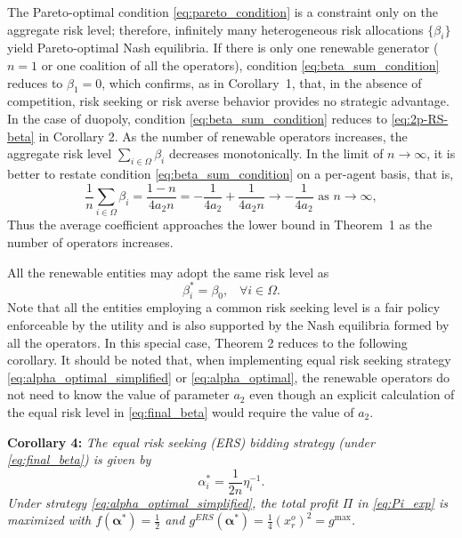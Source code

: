 \documentclass[journal]{IEEEtran}
\begin{document}
The Pareto-optimal condition \eqref{eq:pareto_condition} is a constraint only on the aggregate risk level; therefore, infinitely many heterogeneous risk allocations $\{\beta_i\}$ yield Pareto-optimal Nash equilibria.
If there is only one renewable generator ($n=1$ or one coalition of all the operators), condition \eqref{eq:beta_sum_condition} reduces to $\beta_1 = 0$,
which confirms, as in Corollary~1, that, in the absence of competition, risk seeking or risk averse behavior provides no strategic advantage. In the case of duopoly, condition \eqref{eq:beta_sum_condition} reduces to \eqref{eq:2p-RS-beta} in Corollary 2. As the number of renewable operators increases, the aggregate risk level $\sum_{i\in\Omega} \beta_i$ decreases monotonically. In the limit of $n\to\infty$, it is better to restate condition \eqref{eq:beta_sum_condition} on a per-agent basis, that is, 
\[
\frac{1}{n}\sum_{i\in\Omega} \beta_i
= \frac{1-n}{4a_2 n}
= -\frac{1}{4a_2} + \frac{1}{4a_2 n} \to 
 -\frac{1}{4a_2} \mbox{ as } n\to\infty, 
\]
Thus the average coefficient approaches the lower bound in Theorem~1 as the number of operators increases.

All the renewable entities may adopt the same risk level as
\begin{equation}
    \beta_i^*=\beta_0, \;\;\; \forall i\in\Omega. \label{eq:final_beta}
\end{equation}   
Note that all the entities employing a common risk seeking level is a fair policy enforceable by the utility and is also supported by the Nash equilibria formed by all the operators. In this special case, Theorem 2 reduces to the following corollary. 
It should be noted that, when implementing equal risk seeking strategy \eqref{eq:alpha_optimal_simplified} or \eqref{eq:alpha_optimal}, the renewable operators do not need to know the value of parameter $a_2$ even though an explicit calculation of the equal risk level in \eqref{eq:final_beta}  would require the value of $a_2$.

\noindent \textbf{Corollary 4:} {\it The equal risk seeking (ERS) bidding strategy (under \eqref{eq:final_beta}) is given by
\begin{equation}
    \alpha_i^* = \frac{1}{2n}\eta_i^{-1}. \label{eq:alpha_optimal_simplified}
\end{equation}
Under strategy \eqref{eq:alpha_optimal_simplified}, the total profit $\Pi$ in \eqref{eq:Pi_exp} is maximized with $f(\boldsymbol{\alpha}^*)=\tfrac12$ and $g^{ERS}(\boldsymbol{\alpha}^*)=\tfrac{1}{4}(x_r^o)^2 =g^{\max}$.}
\end{document}

